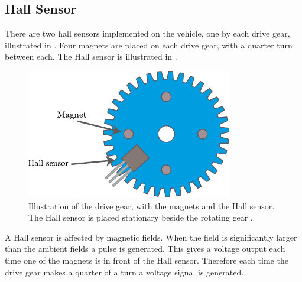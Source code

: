 \subsection{Hall Sensor}
There are two hall sensors implemented on the vehicle, one by each drive gear, illustrated in . Four magnets are placed on each drive gear, with a quarter turn between each. The Hall sensor is illustrated in .

\begin{figure}[H]
	\centering
	\includegraphics[scale=1.2]{figures/hallSensorDrawing.pdf}
	\caption{Illustration of the drive gear, with the magnets and the Hall sensor. The Hall sensor is placed stationary beside the rotating gear \cite{KHSoerensen}.}
	\label{HallSensor}
\end{figure}
%
A Hall sensor is affected by magnetic fields. When the field is significantly larger than the ambient fields a pulse is generated. This gives a voltage output each time one of the magnets is in front of the Hall sensor. Therefore each time the drive gear makes a quarter of a turn a voltage signal is generated.

%
%
